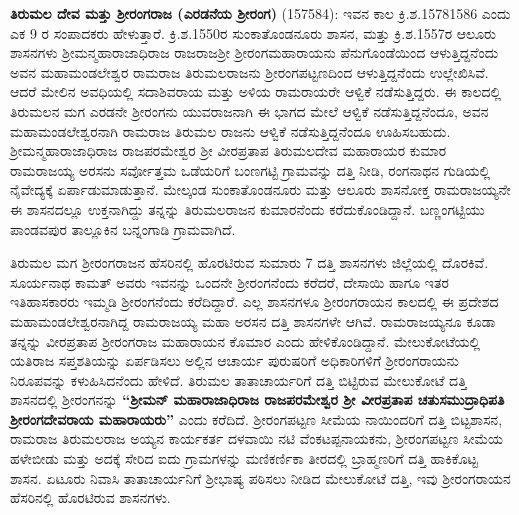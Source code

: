 \textbf{ತಿರುಮಲ ದೇವ ಮತ್ತು ಶ‍್ರೀರಂಗರಾಜ (ಎರಡನೆಯ ಶ‍್ರೀರಂಗ)} (1575\enginline{-}84): ಇವನ ಕಾಲ ಕ್ರಿ.ಶ.1578\enginline{-}1586 ಎಂದು ಎಕ 9 ರ ಸಂಪಾದಕರು ಹೇಳುತ್ತಾರೆ. ಕ್ರಿ.ಶ.1550ರ ಸುಂಕಾತೊಂಡನೂರು ಶಾಸನ, ಮತ್ತು ಕ್ರಿ.ಶ.1557ರ ಆಲೂರು ಶಾಸನಗಳು ಶ‍್ರೀಮನ್ಮಹಾರಾಜಾಧಿರಾಜ ರಾಜರಾಜಶ‍್ರೀ ಶ‍್ರೀರಂಗಮಹಾರಾಯನು ಪೆನುಗೊಂಡೆಯಿಂದ ಆಳುತ್ತಿದ್ದನೆಂದು ಅವನ ಮಹಾಮಂಡಲೇಶ್ವರ ರಾಮರಾಜ ತಿರುಮಲರಾಜನು ಶ‍್ರೀರಂಗಪಟ್ಟಣದಿಂದ ಆಳುತ್ತಿದ್ದನೆಂದು ಉಲ್ಲೇಖಿಸಿವೆ. ಆದರೆ ಮೇಲಿನ ಅವಧಿಯಲ್ಲಿ ಸದಾಶಿವರಾಯ ಮತ್ತು ಅಳಿಯ ರಾಮರಾಯರೇ ಆಳ್ವಿಕೆ ನಡೆಸುತ್ತಿದ್ದರು. ಈ ಕಾಲದಲ್ಲಿ ತಿರುಮಲನ ಮಗ ಎರಡನೇ ಶ‍್ರೀರಂಗನು ಯುವರಾಜನಾಗಿ ಈ ಭಾಗದ ಮೇಲೆ ಆಳ್ವಿಕೆ ನಡೆಸುತ್ತಿದ್ದನೆಂದೂ, ಅವನ ಮಹಾಮಂಡಲೇಶ್ವರನಾಗಿ ರಾಮರಾಜ ತಿರುಮಲ ರಾಜನು ಆಳ್ವಿಕೆ ನಡೆಸುತ್ತಿದ್ದನೆಂದೂ ಊಹಿಸಬಹುದು. ಶ‍್ರೀಮನ್ಮಹಾರಾಜಾಧಿ\-ರಾಜ ರಾಜಪರಮೇಶ್ವರ ಶ‍್ರೀ ವೀರಪ್ರತಾಪ ತಿರುಮಲದೇವ ಮಹಾರಾಯರ ಕುಮಾರ ರಾಮರಾಜಯ್ಯ ಅರಸನು ಸರ್ವೋತ್ತಮ ಒಡೆಯರಿಗೆ ಬಂಣಗಟ್ಟಿ ಗ್ರಾಮವನ್ನು ದತ್ತಿ ನೀಡಿ, ರಂಗನಾಥನ ಗುಡಿಯಲ್ಲಿ ನೈವೇದ್ಯಕ್ಕೆ ಏರ್ಪಾಡು\-ಮಾಡುತ್ತಾನೆ. ಮೇಲ್ಕಂಡ ಸುಂಕಾತೊಂಡನೂರು ಮತ್ತು ಆಲೂರು ಶಾಸನೋಕ್ತ ರಾಮರಾಜಯ್ಯನೇ ಈ ಶಾಸನದಲ್ಲೂ ಉಕ್ತನಾಗಿದ್ದು ತನ್ನನ್ನು ತಿರುಮಲರಾಜನ ಕುಮಾರನೆಂದು ಕರೆದುಕೊಂಡಿದ್ದಾನೆ. ಬಣ್ಣಂಗಟ್ಟಿಯು ಪಾಂಡವಪುರ ತಾಲ್ಲೂಕಿನ ಬನ್ನಂಗಾಡಿ ಗ್ರಾಮವಾಗಿದೆ.

ತಿರುಮಲ ಮಗ ಶ‍್ರೀರಂಗರಾಜನ ಹೆಸರಿನಲ್ಲಿ ಹೊರಟಿರುವ ಸುಮಾರು 7 ದತ್ತಿ ಶಾಸನಗಳು ಜಿಲ್ಲೆಯಲ್ಲಿ ದೊರಕಿವೆ. ಸೂರ್ಯನಾಥ ಕಾಮತ್​ ಅವರು ಇವನನ್ನು ಒಂದನೇ ಶ‍್ರೀರಂಗನೆಂದು ಕರೆದರೆ, ದೇಸಾಯಿ ಹಾಗೂ ಇತರ ಇತಿಹಾಸಕಾರರು ಇಮ್ಮಡಿ ಶ‍್ರೀರಂಗನೆಂದು ಕರೆದಿದ್ದಾರೆ. ಎಲ್ಲ ಶಾಸನಗಳೂ ಶ‍್ರೀರಂಗರಾಯನ ಕಾಲದಲ್ಲಿ ಈ ಪ್ರದೇಶದ ಮಹಾಮಂಡಲೇಶ್ವರ\-ನಾಗಿದ್ದ ರಾಮರಾಜಯ್ಯ ಮಹಾ ಅರಸನ ದತ್ತಿ ಶಾಸನಗಳೇ ಆಗಿವೆ. ರಾಮರಾಜಯ್ಯನೂ ಕೂಡಾ ತನ್ನನ್ನು ವೀರಪ್ರತಾಪ ಶ‍್ರೀರಂಗರಾಜ ಮಹಾರಾಯನ ಕೊಮಾರ ಎಂದು ಹೇಳಿಕೊಂಡಿದ್ದಾನೆ. ಮೇಲುಕೋಟೆಯಲ್ಲಿ ಯತಿರಾಜ ಸಪ್ತ\-ಶತಿಯನ್ನು ಏರ್ಪಡಿಸಲು ಅಲ್ಲಿನ ಆಚಾರ್ಯ ಪುರುಷರಿಗೆ ಅಧಿಕಾರಿಗಳಿಗೆ ಶ‍್ರೀರಂಗರಾಯನು ನಿರೂಪವನ್ನು ಕಳುಹಿಸಿದನೆಂದು ಹೇಳಿದೆ. ತಿರುಮಲ ತಾತಾಚಾರ್ಯರಿಗೆ ದತ್ತಿ ಬಿಟ್ಟಿರುವ ಮೇಲುಕೋಟೆ ದತ್ತಿ ಶಾಸನದಲ್ಲಿ ಶ‍್ರೀರಂಗನನ್ನು \textbf{“ಶ‍್ರೀಮನ್​ ಮಹಾರಾಜಾಧಿರಾಜ ರಾಜಪರಮೇಶ್ವರ ಶ‍್ರೀ ವೀರಪ್ರತಾಪ ಚತುಸಮುದ್ರಾಧಿಪತಿ ಶ‍್ರೀರಂಗದೇವರಾಯ ಮಹಾರಾಯರು”} ಎಂದು ಕರೆದಿದೆ. ಶ‍್ರೀರಂಗಪಟ್ಟಣ ಸೀಮೆಯ ನಾಯಿಂದರಿಗೆ ದತ್ತಿ ಬಿಟ್ಟಶಾಸನ, ರಾಮರಾಜ ತಿರುಮಲರಾಜ ಅಯ್ಯನ ಕಾರ್ಯಕರ್ತ ದಳವಾಯಿ ನಟಿ ವೆಂಕಟಪ್ಪನಾಯಕನು, ಶ‍್ರೀರಂಗಪಟ್ಟಣ ಸೀಮೆಯ ಹಳೇಬೀಡು ಮತ್ತು ಅದಕ್ಕೆ ಸೇರಿದ ಐದು ಗ್ರಾಮಗಳನ್ನು ಮಣಿಕರ್ಣಿಕಾ ತೀರದಲ್ಲಿ ಬ್ರಾಹ್ಮಣರಿಗೆ ದತ್ತಿ ಹಾಕಿಕೊಟ್ಟ ಶಾಸನ. ಏಟೂರು ನಿವಾಸಿ ತಾತಾಚಾರ್ಯನಿಗೆ ಶ‍್ರೀಭಾಷ್ಯ ಪಠಿಸಲು ನೀಡಿದ ಮೇಲುಕೋಟೆ ದತ್ತಿ, ಇವು ಶ‍್ರೀರಂಗರಾಯನ ಹೆಸರಿನಲ್ಲಿ ಹೊರಟಿರುವ ಶಾಸನಗಳು.

